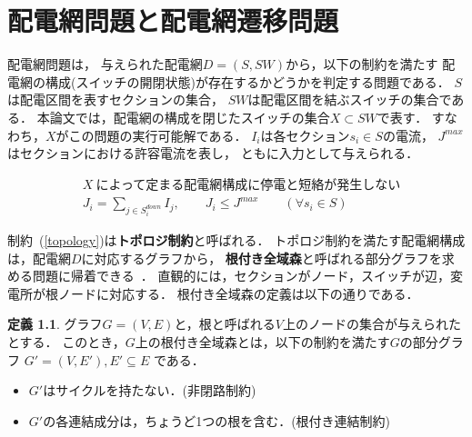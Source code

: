 \chapter{配電網問題と配電網遷移問題}\label{chap:problem}

配電網問題は，
与えられた配電網$D=(S,SW)$から，以下の制約を満たす
配電網の構成(スイッチの開閉状態)が存在するかどうかを判定する問題である．
$S$は配電区間を表すセクションの集合，
$SW$は配電区間を結ぶスイッチの集合である．
本論文では，配電網の構成を閉じたスイッチの集合$X\subset SW$で表す．
すなわち，$X$がこの問題の実行可能解である．
$I_{i}$は各セクション$s_{i}\in S$の電流，
$J^{max}$はセクションにおける許容電流を表し，
ともに入力として与えられる．

% 
\begin{eqnarray}
& X ~\textrm{によって定まる配電網構成に停電と短絡が発生しない}   \label{topology}\\
& J_i = \displaystyle\sum_{j\in S_i^{down}} I_j, \qquad J_i \leq J^{max}
  \qquad (\forall s_{i}\in S)\label{electrical}
\end{eqnarray}
%

制約~(\ref{topology})は\textbf{トポロジ制約}と呼ばれる．
トポロジ制約を満たす配電網構成は，配電網$D$に対応するグラフから，
\textbf{根付き全域森}と呼ばれる部分グラフを求める問題に帰着できる~\cite{Minato:dnet:netuki}．
直観的には，セクションがノード，スイッチが辺，変電所が根ノードに対応する．
根付き全域森の定義は以下の通りである．

\theoremstyle{definition}
\newtheorem*{definition*}{定義}
\begin{definition*}
  グラフ$G=(V,E)$と，根と呼ばれる$V$上のノードの集合が与えられたとする．
  このとき，$G$上の根付き全域森とは，以下の制約を満たす$G$の部分グラフ
  $G'=(V,E'), E' \subseteq E$ である．
  \begin{itemize}
  \item $G'$はサイクルを持たない．(非閉路制約)
  \item $G'$の各連結成分は，ちょうど1つの根を含む．(根付き連結制約)
  \end{itemize}
\end{definition*}

